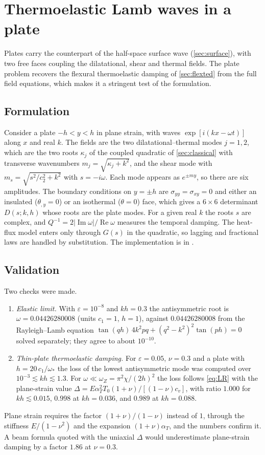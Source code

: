 \section{Thermoelastic Lamb waves in a plate}\label{sec:lamb}

Plates carry the counterpart of the half-space surface wave (\cref{sec:surface}), with two free faces coupling the dilatational, shear and thermal fields. The plate problem recovers the flexural thermoelastic damping of \cref{sec:flexted} from the full field equations, which makes it a stringent test of the formulation.

\subsection{Formulation}
Consider a plate $-h<y<h$ in plane strain, with waves $\exp[i(kx-\omega t)]$ along $x$ and real $k$. The fields are the two dilatational--thermal modes $j=1,2$, which are the two roots $\kappa_j$ of the coupled quadratic of \cref{sec:classical} with transverse wavenumbers $m_j=\sqrt{\kappa_j+k^2}$, and the shear mode with $m_s=\sqrt{s^2/c_2^2+k^2}$ with $s=-i\omega$. Each mode appears as $e^{\pm m y}$, so there are six amplitudes. The boundary conditions on $y=\pm h$ are $\sigma_{yy}=\sigma_{xy}=0$ and either an insulated ($\theta_{,y}=0$) or an isothermal ($\theta=0$) face, which gives a $6\times6$ determinant $D(s;k,h)$ whose roots are the plate modes. For a given real $k$ the roots $s$ are complex, and $Q^{-1}=2|\operatorname{Im}\omega|/\operatorname{Re}\omega$ measures the temporal damping. The heat-flux model enters only through $G(s)$ in the quadratic, so lagging and fractional laws are handled by substitution. The implementation is in .

\subsection{Validation}
Two checks were made.
\begin{enumerate}
\item \emph{Elastic limit.} With $\varepsilon=10^{-8}$ and $kh=0.3$ the antisymmetric root is $\omega=0.04426280008$ (units $c_1=1$, $h=1$), against $0.04426280008$ from the Rayleigh--Lamb equation $\tan(qh)\,4k^2pq+(q^2-k^2)^2\tan(ph)=0$ solved separately; they agree to about $10^{-10}$.
\item \emph{Thin-plate thermoelastic damping.} For $\varepsilon=0.05$, $\nu=0.3$ and a plate with $h=20\,c_1/\omega_*$ the loss of the lowest antisymmetric mode was computed over $10^{-3}\lesssim kh\lesssim1.3$. For $\omega\ll\omega_Z=\pi^2\chi/(2h)^2$ the loss follows \cref{eq:LR} with the plane-strain value $\Delta=E\alpha_T^2T_0(1+\nu)/[(1-\nu)c_v]$, with ratio $1.000$ for $kh\lesssim0.015$, $0.998$ at $kh=0.036$, and $0.989$ at $kh=0.088$.
\end{enumerate}
Plane strain requires the factor $(1+\nu)/(1-\nu)$ instead of $1$, through the stiffness $E/(1-\nu^2)$ and the expansion $(1+\nu)\alpha_T$, and the numbers confirm it. A beam formula quoted with the uniaxial $\Delta$ would underestimate plane-strain damping by a factor $1.86$ at $\nu=0.3$.

